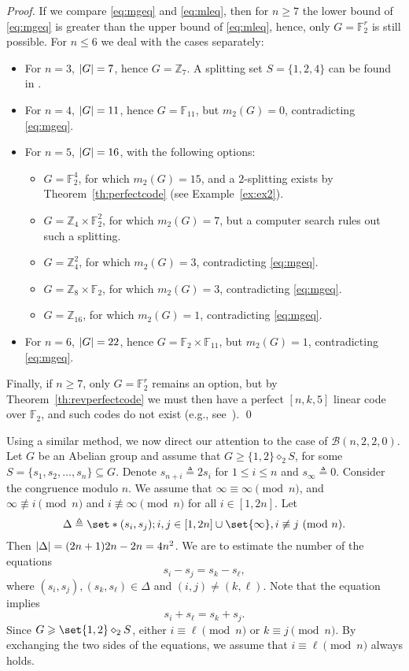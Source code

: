 \documentclass[sort&compress]{elsarticle}
\DeclarePairedDelimiter\abs{\lvert}{\rvert}
\newcommand{\cB}{\mathcal{B}}
\renewcommand{\leq}{\leqslant}
\renewcommand{\geq}{\geqslant}
\newcommand{\ppmod}[1]{~({\rm mod~}#1)}
\newcommand{\F}{\mathbb{F}}
\newcommand{\Z}{\mathbb{Z}}
\newcommand{\eqdef}{\triangleq}
\newcommand{\splt}{\diamond}
\begin{document}
\begin{proof}
  If we compare \eqref{eq:mgeq} and \eqref{eq:mleq}, then for $n\geq
  7$ the lower bound of \eqref{eq:mgeq} is greater than the upper
  bound of \eqref{eq:mleq}, hence, only $G=\F_2^r$ is still
  possible. For $n\leq 6$ we deal with the cases separately:
  \begin{itemize}
  \item
    For $n=3$, $\abs{G}=7$, hence $G=\Z_7$.   A splitting set $S=\{1,2,4\}$ can be found in  \cite[Theorem 6]{BuzEtz12}.  
   \item
    For $n=4$, $\abs{G}=11$, hence $G=\F_{11}$, but $m_2(G)=0$,
    contradicting \eqref{eq:mgeq}.
  \item
    For $n=5$, $\abs{G}=16$, with the following options:
    \begin{itemize}
    \item
      $G=\F_2^4$, for which $m_2(G)=15$, and a $2$-splitting exists by
      Theorem~\ref{th:perfectcode} (see Example~\ref{ex:ex2}).
    \item
      $G=\Z_4\times\F_2^2$, for which $m_2(G)=7$, but a computer
      search rules out such a splitting.
    \item
      $G=\Z_4^2$, for which $m_2(G)=3$, contradicting \eqref{eq:mgeq}.
    \item
      $G=\Z_8\times\F_2$, for which $m_2(G)=3$, contradicting \eqref{eq:mgeq}.
    \item
      $G=\Z_{16}$, for which $m_2(G)=1$, contradicting \eqref{eq:mgeq}.
    \end{itemize}
  \item
    For $n=6$, $\abs{G}=22$, hence $G=\F_2\times\F_{11}$, but
    $m_2(G)=1$, contradicting \eqref{eq:mgeq}.
  \end{itemize}
  Finally, if $n\geq 7$, only $G=\F_2^r$ remains an option, but by
  Theorem~\ref{th:revperfectcode} we must then have a perfect
  $[n,k,5]$ linear code over $\F_2$, and such codes do not exist
  (e.g., see~\cite{MacSlo78}).  \qed\end{proof}


  Using a similar method, we now direct our attention to the case of
  $\cB(n,2,2,0)$.  Let $G$ be an Abelian group and assume that $G \geq
  \{1,2\} \splt_2 S$, for some $S=\{s_1,s_2,\ldots, s_n\} \subseteq
  G$. Denote $s_{n+i}\eqdef 2s_i$ for $1\leq i\leq n$ and $s_\infty \eqdef 0$. 
  Consider the congruence modulo $n$. We assume that $\infty \equiv \infty \pmod{n}$, and $\infty \not \equiv i \pmod{n}$ and $i \not \equiv \infty \pmod{n}$ for all $i \in [1,2n]$.
  Let
  \[\Delta \eqdef \set*{(s_i,s_j) ;  i,j \in [1,2n]\cup \set{\infty}, i\not\equiv j \ppmod{n}}.\]
    Then $\abs{\Delta}= (2n+1)2n-2n=4n^2$. We are to estimate
  the number of the equations
  \[s_i-s_j=s_k-s_\ell,\]
  where $(s_i,s_j),(s_k,s_\ell) \in \Delta$ and $(i,j)\neq (k,\ell)$. Note
  that the equation implies
  \[s_i+s_\ell=s_k+s_j.\]
  Since $G \geq \set{1,2} \splt_2 S$, either $i\equiv \ell \pmod{n}$ or
  $k \equiv j \pmod{n}$.  By exchanging the two sides of the
  equations, we assume that $i\equiv \ell \pmod{n}$ always holds.
\end{document}
